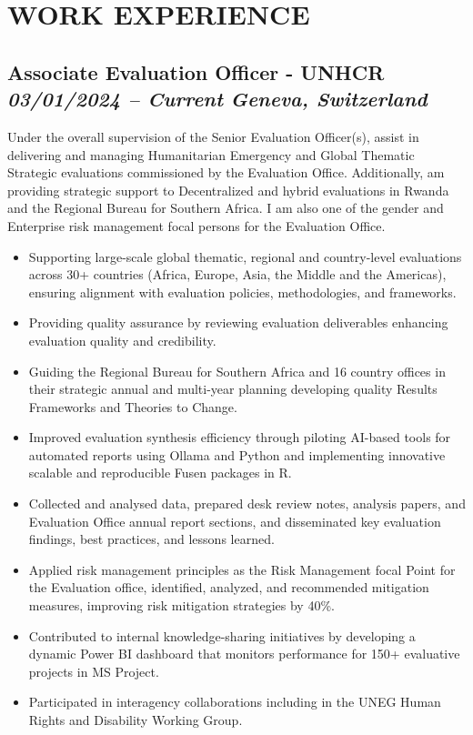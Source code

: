 \documentclass[
  10pt,
]{article}
\providecommand{\tightlist}{%
  \setlength{\itemsep}{0pt}\setlength{\parskip}{0pt}}
\begin{document}
\vspace{0.5cm}

\section{WORK EXPERIENCE}\label{work-experience}

\subsection{\texorpdfstring{Associate Evaluation Officer - UNHCR
\emph{03/01/2024 -- Current} \textbar{} \emph{Geneva, Switzerland}}{Associate Evaluation Officer - UNHCR 03/01/2024 -- Current \textbar{} Geneva, Switzerland}}\label{associate-evaluation-officer---unhcr-03012024-current-geneva-switzerland}

Under the overall supervision of the Senior Evaluation Officer(s), assist in delivering and managing Humanitarian Emergency and Global Thematic Strategic evaluations commissioned by the Evaluation Office. Additionally, am providing strategic support to Decentralized and hybrid evaluations in Rwanda and the Regional Bureau for Southern Africa. I am also one of the gender and Enterprise risk management focal persons for the Evaluation Office.

\begin{itemize}
\tightlist
\item
Supporting large-scale global thematic, regional and country-level evaluations across 30+ countries (Africa, Europe, Asia, the Middle and the Americas), ensuring alignment with evaluation policies, methodologies, and frameworks.
\item
Providing quality assurance by reviewing evaluation deliverables enhancing evaluation quality and credibility.
\item
Guiding the Regional Bureau for Southern Africa and 16 country offices in their strategic annual and multi-year planning developing quality Results Frameworks and Theories to Change.
\item
Improved evaluation synthesis efficiency through piloting AI-based tools for automated reports using Ollama and Python and implementing innovative scalable and reproducible Fusen packages in R.
\item
Collected and analysed data, prepared desk review notes, analysis papers, and Evaluation Office annual report sections, and disseminated key evaluation findings, best practices, and lessons learned.
\item
Applied risk management principles as the Risk Management focal Point for the Evaluation office, identified, analyzed, and recommended mitigation measures, improving risk mitigation strategies by 40\%.
\item
Contributed to internal knowledge-sharing initiatives by developing a dynamic Power BI dashboard that monitors performance for 150+ evaluative projects in MS Project.
\item
Participated in interagency collaborations including in the UNEG Human Rights and Disability Working Group.
\end{itemize}
\end{document}
